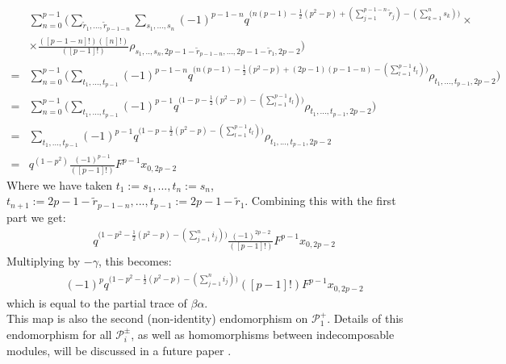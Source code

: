 \documentclass[]{article}
\begin{document}
\begin{align*}
&\sum\limits_{n=0}^{p-1}\bigg(\sum\limits_{\tilde{r}_{1},...,\tilde{r}_{p-1-n}}\sum\limits_{s_{1},...,s_{n}}(-1)^{p-1-n}q^{\big(n(p-1)-\frac{1}{2}(p^{2}-p)+(\sum\limits_{j=1}^{p-1-n}\tilde{r}_{j})-(\sum\limits_{k=1}^{n}s_{k})\big)}\times\\
&\times\frac{([p-1-n]!)([n]!)}{([p-1]!)}\rho_{s_{1},..,s_{n},2p-1-\tilde{r}_{p-1-n},...,2p-1-\tilde{r}_{1},2p-2}\bigg)\\
=&\sum\limits_{n=0}^{p-1}\bigg(\sum\limits_{t_{1},...,t_{p-1}}(-1)^{p-1-n}q^{\big(n(p-1)-\frac{1}{2}(p^{2}-p)+(2p-1)(p-1-n)-(\sum\limits_{l=1}^{p-1}t_{l})\big)}\rho_{t_{1},...,t_{p-1},2p-2}\bigg)\\
=&\sum\limits_{n=0}^{p-1}\bigg(\sum\limits_{t_{1},...,t_{p-1}}(-1)^{p-1}q^{\big(1-p-\frac{1}{2}(p^{2}-p)-(\sum\limits_{l=1}^{p-1}t_{l})\big)}\rho_{t_{1},...,t_{p-1},2p-2}\bigg)\\
=&\sum\limits_{t_{1},...,t_{p-1}}(-1)^{p-1}q^{\big(1-p-\frac{1}{2}(p^{2}-p)-(\sum\limits_{l=1}^{p-1}t_{l})\big)}\rho_{t_{1},...,t_{p-1},2p-2}\\
=& q^{(1-p^{2})}\frac{(-1)^{p-1}}{([p-1]!)}F^{p-1}x_{0,2p-2}
\end{align*}
Where we have taken $t_{1}:=s_{1},...,t_{n}:=s_{n}$, $t_{n+1}:=2p-1-\tilde{r}_{p-1-n},...,t_{p-1}:=2p-1-\tilde{r}_{1}$.
Combining this with the first part we get:
\begin{align*}
& q^{\big(1-p^{2}-\frac{1}{2}(p^{2}-p)-(\sum\limits_{j=1}^{n}i_{j})\big)} \frac{(-1)^{2p-2}}{([p-1]!)}F^{p-1}x_{0,2p-2}
\end{align*}
Multiplying by $-\gamma$, this becomes:
\begin{align*}
& (-1)^{p}q^{\big(1-p^{2}-\frac{1}{2}(p^{2}-p)-(\sum\limits_{j=1}^{n}i_{j})\big)}([p-1]!)F^{p-1}x_{0,2p-2}
\end{align*}
which is equal to the partial trace of $\beta\alpha$.\\
This map is also the second (non-identity) endomorphism on $\mathcal{P}^{+}_{1}$. Details of this endomorphism for all $\mathcal{P}^{\pm}_{i}$, as well as homomorphisms between indecomposable modules, will be discussed in a future paper \cite{Me2}.
\end{document}
